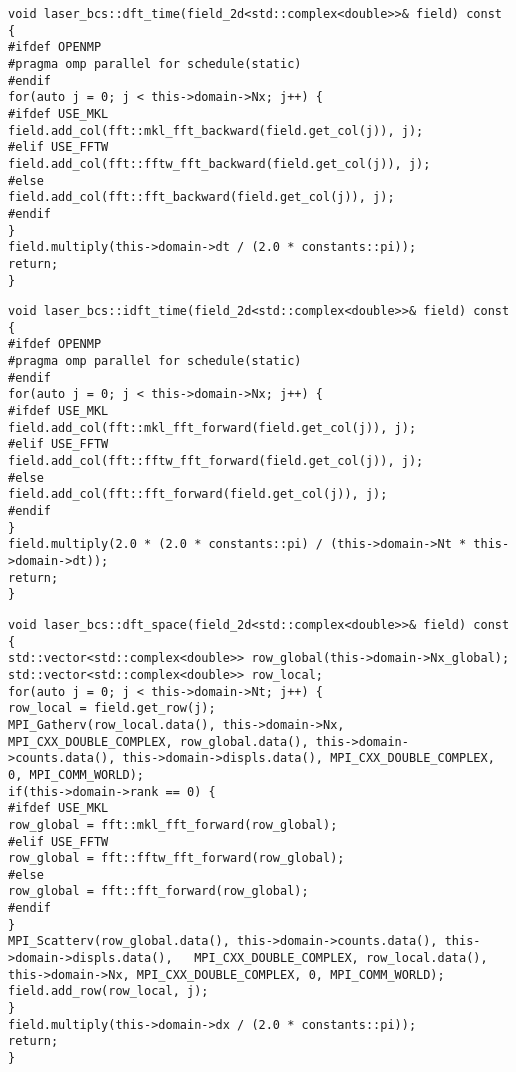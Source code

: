 \begin{lstlisting}[style=CXX, caption=Method for performing discrete Fourier transform in time]
void laser_bcs::dft_time(field_2d<std::complex<double>>& field) const {
#ifdef OPENMP
#pragma omp parallel for schedule(static)
#endif
for(auto j = 0; j < this->domain->Nx; j++) {
#ifdef USE_MKL
field.add_col(fft::mkl_fft_backward(field.get_col(j)), j);
#elif USE_FFTW
field.add_col(fft::fftw_fft_backward(field.get_col(j)), j);
#else
field.add_col(fft::fft_backward(field.get_col(j)), j);
#endif
}
field.multiply(this->domain->dt / (2.0 * constants::pi));
return;
}
\end{lstlisting}

\begin{lstlisting}[style=CXX, caption=Method for performing inverse discrete Fourier transform in time]
void laser_bcs::idft_time(field_2d<std::complex<double>>& field) const {
#ifdef OPENMP
#pragma omp parallel for schedule(static)
#endif
for(auto j = 0; j < this->domain->Nx; j++) {
#ifdef USE_MKL
field.add_col(fft::mkl_fft_forward(field.get_col(j)), j);
#elif USE_FFTW
field.add_col(fft::fftw_fft_forward(field.get_col(j)), j);
#else
field.add_col(fft::fft_forward(field.get_col(j)), j);
#endif
}
field.multiply(2.0 * (2.0 * constants::pi) / (this->domain->Nt * this->domain->dt));
return;
}
\end{lstlisting}

\begin{lstlisting}[style=CXX, caption=Method for performing discrete Fourier transform in space]
void laser_bcs::dft_space(field_2d<std::complex<double>>& field) const {
std::vector<std::complex<double>> row_global(this->domain->Nx_global);
std::vector<std::complex<double>> row_local;
for(auto j = 0; j < this->domain->Nt; j++) {
row_local = field.get_row(j);
MPI_Gatherv(row_local.data(), this->domain->Nx, MPI_CXX_DOUBLE_COMPLEX, row_global.data(), this->domain->counts.data(), this->domain->displs.data(), MPI_CXX_DOUBLE_COMPLEX, 0, MPI_COMM_WORLD);
if(this->domain->rank == 0) {
#ifdef USE_MKL
row_global = fft::mkl_fft_forward(row_global);
#elif USE_FFTW
row_global = fft::fftw_fft_forward(row_global);
#else
row_global = fft::fft_forward(row_global);
#endif
}
MPI_Scatterv(row_global.data(), this->domain->counts.data(), this->domain->displs.data(), 	MPI_CXX_DOUBLE_COMPLEX, row_local.data(), this->domain->Nx, MPI_CXX_DOUBLE_COMPLEX, 0, MPI_COMM_WORLD);
field.add_row(row_local, j);
}
field.multiply(this->domain->dx / (2.0 * constants::pi));
return;
}
\end{lstlisting}

